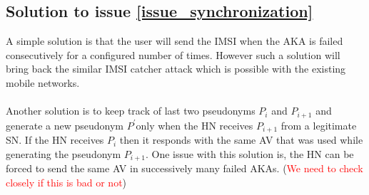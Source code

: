 \documentclass[12pt]{article}
\begin{document}
\subsection*{Solution to issue \ref{issue_synchronization}} A simple solution is that the user will send the IMSI when the AKA is failed consecutively for a configured number of times. However such a solution will bring back the similar IMSI catcher attack which is possible with the existing mobile networks. 

\paragraph{} Another solution is to keep track of last two pseudonyms $P_{i}$ and $P_{i+1}$ and generate a new pseudonym $P^{'} $only when the HN receives $P_{i+1}$ from a legitimate SN. If the HN receives $P_{i}$ then it responds with the same AV that was used while generating the pseudonym $P_{i+1}$. One issue with this solution is, the HN can be forced to send the same AV in successively many failed AKAs. (\textcolor{red}{We need to check closely if this is bad or not})
\end{document}
